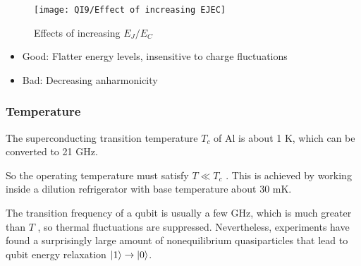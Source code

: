 \begin{figure}[!htb]
    \centering
    \texttt{[image: QI9/Effect of increasing EJEC]}
    \caption{Effects of increasing $E_J /E_C$}
\end{figure}
\begin{itemize}\small
    \item Good: Flatter energy levels, insensitive to charge fluctuations
    \item Bad: Decreasing anharmonicity
\end{itemize}

\subsubsection{Temperature}

The superconducting transition temperature $T_c$ of Al is about 1 K, which can be converted to 21 GHz.

So the operating temperature must satisfy $T\ll T_c$ . This is achieved by working inside a dilution refrigerator with base temperature about 30 mK.

The transition frequency of a qubit is usually a few GHz, which is much greater than $T$ , so thermal fluctuations are suppressed. Nevertheless, experiments have found a surprisingly large amount of nonequilibrium quasiparticles that lead to qubit energy relaxation $\ket{1}\rightarrow\ket{0}$. 